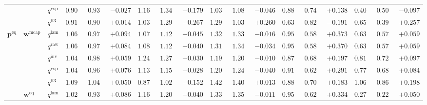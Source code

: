 \documentclass[eng]{kjas3}
\begin{document}
\begin{table}[t]
{\begin{tabular}{lll ccc ccc ccc ccc ccc}
 &  & $q^{\mathrm{vsp}}$ & $0.909$ & $0.935$ & \cellcolor{negred!50}$-0.027$ & $1.167$ & $1.346$ & \cellcolor{negred!50}$-0.179$ & $1.039$ & $1.086$ & \cellcolor{negred!50}$-0.046$ & $0.881$ & $0.742$ & \cellcolor{posgreen!50}$+0.138$ & $0.409$ & $0.506$ & \cellcolor{negred!50}$-0.097$ \\
 &  & $q^{\mathrm{ff3}}$ & $0.918$ & $0.904$ & \cellcolor{posgreen!50}$+0.014$ & $1.032$ & $1.299$ & \cellcolor{negred!50}$-0.267$ & $1.298$ & $1.038$ & \cellcolor{posgreen!50}$+0.260$ & $0.638$ & $0.829$ & \cellcolor{negred!50}$-0.191$ & $0.651$ & $0.394$ & \cellcolor{posgreen!50}$+0.257$ \\
\midrule
$\mathbf{p}^{\mathrm{eq}}$ & $\mathbf{w}^{\mathrm{mcap}}$ & $q^{\mathrm{lam}}$ & $1.067$ & $0.973$ & \cellcolor{posgreen!50}$+0.094$ & $1.076$ & $1.120$ & \cellcolor{negred!50}$-0.045$ & $1.320$ & $1.335$ & \cellcolor{negred!50}$-0.016$ & $0.956$ & $0.583$ & \cellcolor{posgreen!50}$+0.373$ & $0.638$ & $0.578$ & \cellcolor{posgreen!50}$+0.059$ \\
 &  & $q^{\mathrm{raw}}$ & $1.060$ & $0.976$ & \cellcolor{posgreen!50}$+0.084$ & $1.085$ & $1.125$ & \cellcolor{negred!50}$-0.040$ & $1.311$ & $1.345$ & \cellcolor{negred!50}$-0.034$ & $0.953$ & $0.583$ & \cellcolor{posgreen!50}$+0.370$ & $0.638$ & $0.578$ & \cellcolor{posgreen!50}$+0.059$ \\
 &  & $q^{\mathrm{inv}}$ & $1.047$ & $0.988$ & \cellcolor{posgreen!50}$+0.059$ & $1.240$ & $1.270$ & \cellcolor{negred!50}$-0.030$ & $1.195$ & $1.205$ & \cellcolor{negred!50}$-0.010$ & $0.878$ & $0.681$ & \cellcolor{posgreen!50}$+0.197$ & $0.816$ & $0.720$ & \cellcolor{posgreen!50}$+0.097$ \\
 &  & $q^{\mathrm{vsp}}$ & $1.040$ & $0.963$ & \cellcolor{posgreen!50}$+0.076$ & $1.131$ & $1.158$ & \cellcolor{negred!50}$-0.028$ & $1.205$ & $1.245$ & \cellcolor{negred!50}$-0.040$ & $0.914$ & $0.624$ & \cellcolor{posgreen!50}$+0.291$ & $0.772$ & $0.688$ & \cellcolor{posgreen!50}$+0.084$ \\
 &  & $q^{\mathrm{ff3}}$ & $1.099$ & $1.049$ & \cellcolor{posgreen!50}$+0.050$ & $0.872$ & $1.024$ & \cellcolor{negred!50}$-0.152$ & $1.421$ & $1.408$ & \cellcolor{posgreen!50}$+0.013$ & $0.888$ & $0.705$ & \cellcolor{posgreen!50}$+0.183$ & $1.066$ & $0.868$ & \cellcolor{posgreen!50}$+0.198$ \\
\cmidrule(lr){2-18}
 & $\mathbf{w}^{\mathrm{eq}}$ & $q^{\mathrm{lam}}$ & $1.022$ & $0.935$ & \cellcolor{posgreen!50}$+0.086$ & $1.163$ & $1.203$ & \cellcolor{negred!50}$-0.040$ & $1.339$ & $1.350$ & \cellcolor{negred!50}$-0.011$ & $0.955$ & $0.621$ & \cellcolor{posgreen!50}$+0.334$ & $0.277$ & $0.227$ & \cellcolor{posgreen!50}$+0.050$ \\

\end{tabular}}
\end{table}
\end{document}
